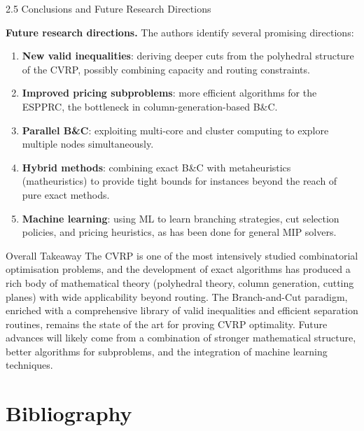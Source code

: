 \documentclass[aspectratio=169,10pt]{beamer}
\begin{document}
\begin{frame}[allowframebreaks]{2.5 Conclusions and Future Research Directions}
  \framebreak

  \textbf{Future research directions.}
  The authors identify several promising directions:
  \begin{enumerate}
    \item \textbf{New valid inequalities}: deriving deeper cuts from the
          polyhedral structure of the CVRP, possibly combining capacity and
          routing constraints.
    \item \textbf{Improved pricing subproblems}: more efficient algorithms
          for the ESPPRC, the bottleneck in column-generation-based B\&C.
    \item \textbf{Parallel B\&C}: exploiting multi-core and cluster computing
          to explore multiple nodes simultaneously.
    \item \textbf{Hybrid methods}: combining exact B\&C with metaheuristics
          (matheuristics) to provide tight bounds for instances beyond the
          reach of pure exact methods.
    \item \textbf{Machine learning}: using ML to learn branching strategies,
          cut selection policies, and pricing heuristics, as has been done
          for general MIP solvers.
  \end{enumerate}

  \framebreak

  \begin{alertblock}{Overall Takeaway}
    The CVRP is one of the most intensively studied combinatorial optimisation
    problems, and the development of exact algorithms has produced a rich body
    of mathematical theory (polyhedral theory, column generation, cutting
    planes) with wide applicability beyond routing. The Branch-and-Cut
    paradigm, enriched with a comprehensive library of valid inequalities and
    efficient separation routines, remains the state of the art for proving
    CVRP optimality. Future advances will likely come from a combination of
    stronger mathematical structure, better algorithms for subproblems, and
    the integration of machine learning techniques.
  \end{alertblock}
\end{frame}

\section{Bibliography}
\end{document}
